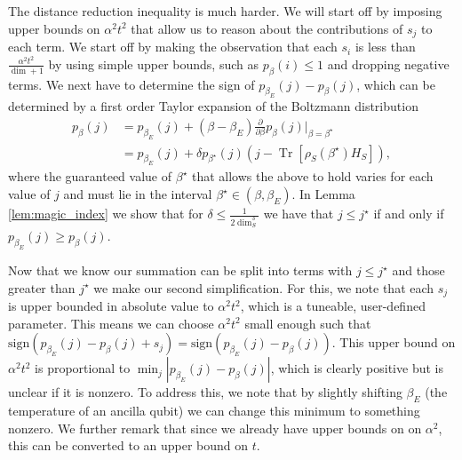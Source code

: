 \documentclass{article}
\newcommand{\brackets}[1]{\left[ #1 \right]}
\DeclareMathOperator{\Tr}{Tr}
\newcommand{\trace}[1]{\Tr \brackets{ #1 }}
\begin{document}
The distance reduction inequality is much harder. We will start off by imposing upper bounds on $\alpha^2 t^2$ that allow us to reason about the contributions of $s_j$ to each term. We start off by making the observation that each $s_i$ is less than $\frac{\alpha^2 t^2}{\dim + 1}$ by using simple upper bounds, such as $p_{\beta}(i) \le 1$ and dropping negative terms. We next have to determine the sign of $p_{\beta_E}(j) - p_{\beta}(j)$, which can be determined by a first order Taylor expansion of the Boltzmann distribution
\begin{align}
    p_{\beta}(j) &= p_{\beta_E}(j) + (\beta - \beta_E) \frac{\partial}{\partial \beta} p_{\beta}(j) \bigg|_{\beta = \beta^{\star}} \\
    &= p_{\beta_E}(j) + \delta p_{\beta^{\star}}(j) (j - \trace{\rho_S(\beta^{\star}) H_S}),
\end{align}
where the guaranteed value of $\beta^{\star}$ that allows the above to hold varies for each value of $j$ and must lie in the interval $\beta^{\star} \in (\beta, \beta_E)$. In Lemma \ref{lem:magic_index} we show that for $\delta \le \frac{1}{2 \dim_S^3}$ we have that $j \le j^\star$ if and only if $p_{\beta_E}(j) \ge p_{\beta}(j)$.

Now that we know our summation can be split into terms with $j \le j^\star$ and those greater than $j^\star$ we make our second simplification. For this, we note that each $s_j$ is upper bounded in absolute value to $\alpha^2 t^2$, which is a tuneable, user-defined parameter. This means we can choose $\alpha^2 t^2$ small enough such that $\text{sign}(p_{\beta_E}(j) - p_{\beta}(j) + s_j) = \text{sign}(p_{\beta_E}(j) - p_{\beta}(j))$. This upper bound on $\alpha^2 t^2$ is proportional to $\min_j |p_{\beta_E}(j) - p_{\beta}(j)|$, which is clearly positive but is unclear if it is nonzero. To address this, we note that by slightly shifting $\beta_E$ (the temperature of an ancilla qubit) we can change this minimum to something nonzero. We further remark that since we already have upper bounds on on $\alpha^2$, this can be converted to an upper bound on $t$.
\end{document}
